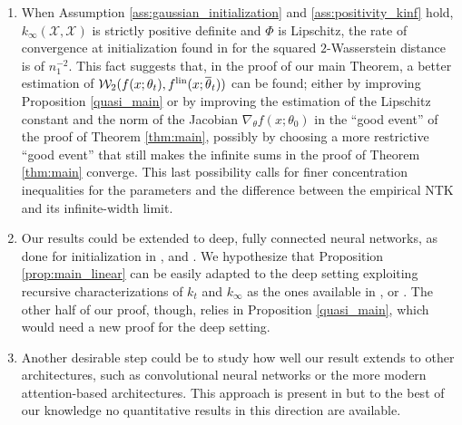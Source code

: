 \documentclass{article}
\theoremstyle{definition}
\theoremstyle{remark}
\numberwithin{equation}{section}
\newcommand{\X}{\mathcal{X}}
\newcommand{\lin}{{\textup{lin}}}
\begin{document}
\begin{enumerate}
    
    \item When Assumption \ref{ass:gaussian_initialization} 
    and \ref{ass:positivity_kinf} 
    hold, $k_\infty(\X,\X)$ is strictly positive definite and $\Phi$ is Lipschitz,
     the rate of convergence at initialization found in \cite{trevisan2023wide} for the squared $2$-Wasserstein distance is of $n_1^{-2}$.
        This fact suggests that, in the proof of our main Theorem, a better estimation of $\mathcal W_2(f(x;\theta_t),f^\lin(x;\overline \theta_t))$ can be found;
        either by improving Proposition \ref{quasi_main} or
        by improving the estimation of the Lipschitz constant and the norm of the Jacobian $\nabla_\theta f(x;\theta_0)$ in the ``good event'' of the proof of Theorem \ref{thm:main},
        possibly by choosing a more restrictive ``good event'' that still makes the infinite sums in the proof of Theorem \ref{thm:main} converge.
        This last possibility calls for finer concentration inequalities for the parameters and the difference between the empirical NTK and its infinite-width limit.
    \item Our results could be extended to deep, fully connected neural networks, as done for initialization in \cite{trevisan2023wide}, \cite{BasteriTrevisan2023} and \cite{Favaro2025}.
        We hypothesize that 
        Proposition \ref{prop:main_linear} can be easily adapted to the deep setting exploiting recursive characterizations of $k_t$ and $k_\infty$ as the ones available in \cite{jacot}, \cite{nguyen} or \cite{Lee2020}.
        The other half of our proof, though, relies in Proposition \ref{quasi_main}, which would need a new proof for the deep setting.
    \item Another desirable step could be to study how well our result extends to other architectures, such as convolutional neural networks or the more modern attention-based architectures.
        This approach is present in \cite{yang2021tensor} but to the best of our knowledge no quantitative results in this direction are available.
\end{enumerate}
\end{document}
